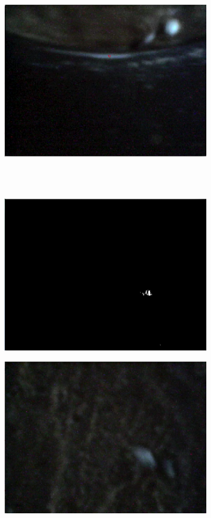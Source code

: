 \begin{figure}
\begin{subfigure}[b]{0.35\textwidth}
                \caption{}
        \end{subfigure}
		\quad
        \begin{subfigure}[b]{0.35\textwidth}
                \includegraphics[scale = 0.3]{img/bad2}
                \caption{}
        \end{subfigure}\hfill \\ \mbox{}\\
        \begin{subfigure}[b]{0.35\textwidth}
                \includegraphics[scale = 0.3]{img/bad3t}
                \caption{}
        \end{subfigure}
		\quad
        \begin{subfigure}[b]{0.35\textwidth}
                \includegraphics[scale = 0.3]{img/bad3}

\end{subfigure}
\end{figure}

